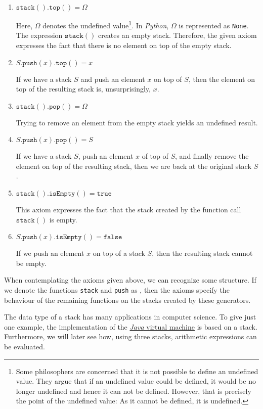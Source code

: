 \begin{enumerate}
\item $\texttt{stack}().\texttt{top}() = \Omega$

      Here, $\Omega$ denotes the undefined value\footnote{
       Some philosophers are concerned that it is not possible to define an undefined value.
       They argue that if an undefined value could be defined, it would be no longer undefined
       and hence it can not be defined.  However, that is precisely the point of the undefined 
       value: As it cannot be defined, it is undefined. \raisebox{-0.1cm}{$\Large\smiley$}}.
      In \textsl{Python}, $\Omega$ is represented as \texttt{None}. The expression $\texttt{stack}()$
      creates an empty stack.  Therefore, the given axiom expresses the fact that there is no
      element on top of the empty stack.
\item $S.\texttt{push}(x).\texttt{top}() = x$

      If we have a stack $S$ and push an element $x$ on top of $S$, then the element on top
      of the resulting stack is, unsurprisingly, $x$.
\item $\texttt{stack}().\texttt{pop}() = \Omega$

      Trying to remove an element from the empty stack yields an undefined result.
\item $S.\texttt{push}(x).\texttt{pop}() = S$

      If we have a stack $S$, push an element $x$ of top of $S$, and finally remove the element
      on top of the resulting stack, then we are back at the original stack $S$.
    
\item $\texttt{stack}().\texttt{isEmpty}() = \texttt{true}$

      This axiom expresses the fact that the stack created by the function call $\texttt{stack}()$
      is empty.
\item $S.\texttt{push}(x).\texttt{isEmpty}() = \texttt{false}$

      If we push an element $x$ on top of a stack $S$, then the resulting stack cannot be empty.
\end{enumerate}
When contemplating the axioms given above, we can recognize some structure.  If we denote the
functions \texttt{stack} and \texttt{push} as ,  then the axioms specify the
behaviour of the remaining functions on the stacks created by these generators.

The data type of a stack has many applications in computer science.  To give just one example, the
implementation of the \href{https://en.wikipedia.org/wiki/Java_virtual_machine}{\textsl{Java} virtual machine}
is based on a stack.  Furthermore,  we will later see how,  using three stacks, arithmetic expressions can be
evaluated. 



